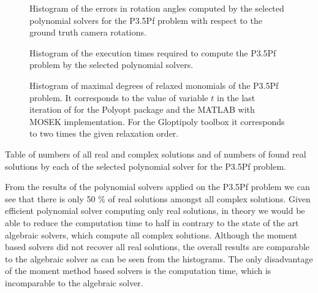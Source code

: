 \begin{figure}[ht]
  \centering
  \resizebox{0.95\textwidth}{!}{}
  \caption{Histogram of the errors in rotation angles computed by the selected polynomial solvers for the P3.5Pf problem with respect to the ground truth camera rotations.}
\end{figure}

\begin{figure}[ht]
  \centering
  \resizebox{0.95\textwidth}{!}{}
  \caption{Histogram of the execution times required to compute the P3.5Pf problem by the selected polynomial solvers.}
\end{figure}

\begin{figure}[ht]
  \centering
  \resizebox{0.95\textwidth}{!}{}
  \caption{Histogram of maximal degrees of relaxed monomials of the P3.5Pf problem. It corresponds to the value of variable $t$ in the last iteration of  for the Polyopt package and the MATLAB with MOSEK implementation. For the Gloptipoly toolbox it corresponds to two times the given relaxation order.}
\end{figure}

\begin{table}[ht]
  \centering
  
  \caption{Table of numbers of all real and complex solutions and of numbers of found real solutions by each of the selected polynomial solver for the P3.5Pf problem.}
\end{table}

From the results of the polynomial solvers applied on the P3.5Pf problem we can see that there is only 50 \% of real solutions amongst all complex solutions.
Given efficient polynomial solver computing only real solutions, in theory we would be able to reduce the computation time to half in contrary to the state of the art algebraic solvers, which compute all complex solutions.
Although the moment based solvers did not recover all real solutions, the overall results are comparable to the algebraic solver as can be seen from the histograms.
The only disadvantage of the moment method based solvers is the computation time, which is incomparable to the algebraic solver.
